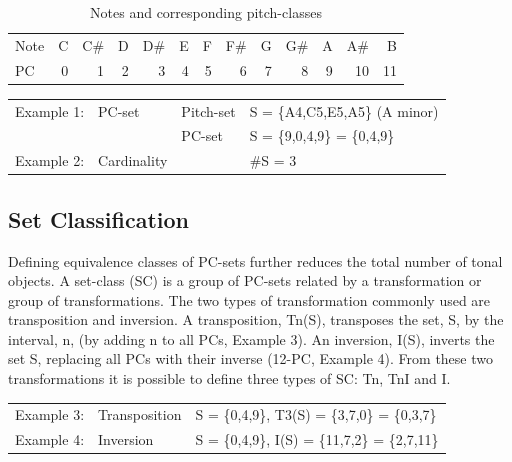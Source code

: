 \documentclass{article}
\begin{document}
\begin{table}[htb]
\caption{Notes and corresponding pitch-classes} 
\begin{center}
\begin{tabular}{lrrrrrrrrrrrr}
 Note  &  C  &  C\#  &  D  &  D\#  &  E  &  F  &  F\#  &  G  &  G\#  &  A  &  A\#  &   B  \\
 PC    &  0  &    1  &  2  &    3  &  4  &  5  &    6  &  7  &    8  &  9  &   10  &  11  \\
\end{tabular}
\end{center}
\end{table}



\begin{center}
\begin{tabular}{llll}
 Example 1:  &  PC-set       &  Pitch-set  &  S = \{A4,C5,E5,A5\} (A minor)  \\
             &               &  PC-set     &  S = \{9,0,4,9\} = \{0,4,9\}    \\
 Example 2:  &  Cardinality  &             &  \#S = 3                        \\
\end{tabular}
\end{center}
\subsection{Set Classification}
\label{sec-3-2}

Defining equivalence classes of PC-sets further reduces the total
number of tonal objects. A set-class (SC) is a group of PC-sets
related by a transformation or group of transformations. The two types
of transformation commonly used are transposition and inversion. A
transposition, Tn(S), transposes the set, S, by the interval, n, (by
adding n to all PCs, Example 3). An inversion, I(S), inverts the set
S, replacing all PCs with their inverse (12-PC, Example 4). From these
two transformations it is possible to define three types of SC: Tn,
TnI and I.


\begin{center}
\begin{tabular}{lll}
 Example 3:  &  Transposition  &  S = \{0,4,9\}, T3(S) = \{3,7,0\} = \{0,3,7\}   \\
 Example 4:  &  Inversion      &  S = \{0,4,9\}, I(S) = \{11,7,2\} = \{2,7,11\}  \\
\end{tabular}
\end{center}
\end{document}
